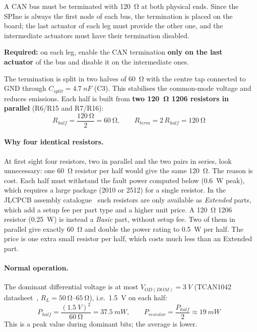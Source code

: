 \documentclass[11pt,a4paper]{article}
\newcommand{\required}[1]{\begin{reqbox}\textbf{\color{reqred}Required:} #1\end{reqbox}}
\begin{document}
A CAN bus must be terminated with \qty{120}{\ohm} at both physical ends. Since the SPIne is always the
first node of each bus, the termination is placed on the board; the last actuator of each leg must
provide the other one, and the intermediate actuators must have their termination disabled.

\required{on each leg, enable the CAN termination \textbf{only on the last actuator} of the bus
and disable it on the intermediate ones.}

The termination is split in two halves of \qty{60}{\ohm} with the centre tap connected to GND through
$C_{split} = \qty{4.7}{nF}$ (C3). This stabilises the common-mode voltage and reduces emissions. Each half
is built from \textbf{two \qty{120}{\ohm} 1206 resistors in parallel} (R6/R15 and R7/R16):
\begin{equation}
R_{half} = \frac{\qty{120}{\ohm}}{2} = \qty{60}{\ohm}, \qquad R_{term} = 2\,R_{half} = \qty{120}{\ohm}
\end{equation}

\paragraph{Why four identical resistors.} At first sight four resistors, two in parallel and the two pairs
in series, look unnecessary: one \qty{60}{\ohm} resistor per half would give the same \qty{120}{\ohm}. The reason is
cost. Each half must withstand the fault power computed below (\qty{0.6}{W} peak), which requires a
large package (2010 or 2512) for a single resistor. In the JLCPCB assembly catalogue~\cite{jlcparts} such
resistors are only available as \textit{Extended} parts, which add a setup fee per part type and a higher
unit price. A \qty{120}{\ohm} 1206 resistor (\qty{0.25}{W}) is instead a \textit{Basic} part, without setup fee. Two of
them in parallel give exactly \qty{60}{\ohm} and double the power rating to \qty{0.5}{W} per half. The price is
one extra small resistor per half, which costs much less than an Extended part.

\paragraph{Normal operation.} The dominant differential voltage is at most $V_{OD(DOM)} = \qty{3}{V}$
(TCAN1042 datasheet~\cite{tcan}, $R_L = \qtyrange{50}{65}{\ohm}$), i.e.\ \qty{1.5}{V} on each half:
\begin{equation}
P_{half} = \frac{(\qty{1.5}{V})^2}{\qty{60}{\ohm}} = \qty{37.5}{mW}, \qquad
P_{resistor} = \frac{P_{half}}{2} \approx \qty{19}{mW}
\end{equation}
This is a peak value during dominant bits; the average is lower.
\end{document}
